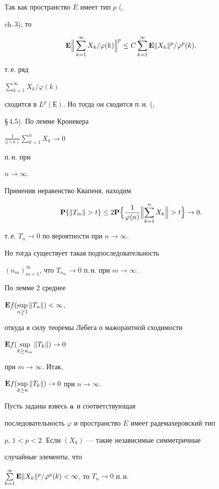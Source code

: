 \begin{pf} Так как пространство $E$ имеет тип $p$ (\cite{Pis},


ch.\,3), то


$$


{\bold E}


\Bigl\|\, \sum^{\infty }_{k=1} X_{k} /\varphi (k)\Bigr\| ^{p}


\le C\sum^{\infty }_{k=1}


{\bold E} \| X_{k} \| ^{p} /\varphi ^{p} (k),


$$


т.\,е. ряд


$\sum\limits^{\infty }_{k=1} X_{k} /\varphi (k)$


сходится в $L^{p}(Е)$. Но тогда он сходится п.\,н. (\cite{Tay},


\S\,4.5). По лемме Кронекера


$\frac{1}{\varphi (n)}\sum\limits^n_{k=1}X_k\to 0$


п.\,н. при


$n\to\infty $.





Применив неравенство Квапеня, находим


$$


\bold P\{\|T_m\|>t\}\le 2\bold P\Bigl\{\frac{1}{\varphi(n)}


\Bigl\|\sum^n_{k=1}X_k\Bigr\|>t\Bigr\}\to 0.


$$


т.\,е. $T_n\to 0$ по вероятности при $n\to\infty$.


Но тогда существует такая подпоследовательность


$(n_m)_{m=1}^\infty$, что $T_{n_m}\to 0$ п.\,н. при $m\to\infty$.


По лемме 2 среднее


${\bold E}f(\sup\limits_{n\ge 1}\| T_{n} \|)<\infty$,


откуда в силу теоремы Лебега о мажорантной сходимости


${\bold E}f(\sup\limits_{k\ge n_m}\| T_{k} \|)\to 0$


при $m\to\infty$. Итак,


${\bold E}f(\sup\limits_{k\ge n}\| T_{k} \| ) \to 0$ при $n\to \infty $.


\end{pf}





\begin{cornonum} Пусть заданы взвесь ${\bold a}$ и соответствующая


последовательность $\varphi $ и пространство $E$ имеет радемахеровский тип


$p$, $1<p<2$. Если $(X_{k} )$ --- такие независимые симметричные


случайные элементы, что


$\sum\limits^{\infty }_{k=1} {\bold E} \| X_{k} \| ^{p}


/\varphi ^{p} (k)<\infty $, то $T_{n} \to 0$ п.\,н.


\end{cornonum}






